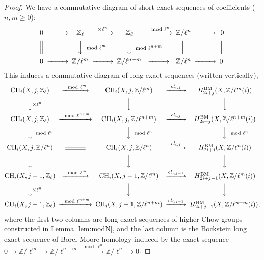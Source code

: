 \documentclass{amsart}
\theoremstyle{definition}
\theoremstyle{remark}
\newcommand{\mbb}{\mathbb}
\newcommand{\ZZ}{\mbb{Z}}
\begin{document}
\begin{proof}
    We have a commutative diagram of short exact sequences of coefficients ($n, m \geq 0$):
    \[
    \begin{CD}
        0 @>>> \ZZ_\ell @>\times \ell^n>> \ZZ_\ell @>\mod \ell^n>> \ZZ/\ell^n @>>> 0\\
        @| @VV\mod \ell^m V @VV\mod \ell^{n+m}V @| @|\\
        0 @>>> \ZZ/\ell^m @>>> \ZZ/\ell^{n+m} @>>> \ZZ/\ell^n @>>> 0.\\
    \end{CD}
    \]
    This induces a commutative diagram of long exact sequences (written vertically), 
    \[
    \begin{CD}
         \text{CH}_i(X, j, \ZZ_\ell) @>{\mod \ell^m}>> \text{CH}_i(X, j, \ZZ/\ell^m) @>cl_{i, j}>> H_{2i+j}^{\text{BM}}(X, \ZZ/{\ell^m}(i)) \\
        @VV\times \ell^n V @VVV @VVV \\
         \text{CH}_i(X, j, \ZZ_\ell) @>{\mod \ell^{n+m}}>> \text{CH}_i(X, j, \ZZ/{\ell^{n+m}}) @>cl_{i, j}>> H_{2i+j}^{\text{BM}}(X, \ZZ/{\ell^{n+m}}(i))\\
        @VV\mod \ell^n V @VV\mod \ell^n V @VV\mod \ell^n V \\
          \text{CH}_i(X, j, \ZZ/\ell^n) @=\text{CH}_i(X, j, \ZZ/\ell^n) @>cl_{i, j}>> H_{2i+j}^{\text{BM}}(X, \ZZ/{\ell^n}(i))\\
          @VVV @VVV @VVV\\
          \text{CH}_i(X, j-1, \ZZ_\ell)@>{\mod \ell^m}>> \text{CH}_i(X, j-1, \ZZ/\ell^m) @>cl_{i, j-1}>> H_{2i+j-1}^{\text{BM}}(X, \ZZ/{\ell^m}(i))\\
          @VV\times \ell^n V @VVV @VVV \\
         \text{CH}_i(X, j-1, \ZZ_\ell) @>{\mod \ell^{n+m}}>> \text{CH}_i(X, j-1, \ZZ/{\ell^{n+m}}) @>cl_{i, j-1}>> H_{2i+j-1}^{\text{BM}}(X, \ZZ/{\ell^{n+m}}(i)),
    \end{CD}
    \]
    where the first two columns are long exact sequences of higher Chow groups constructed in Lemma \ref{lem:modN}, and the last column is the Bockstein long exact sequence of Borel-Moore homology induced by the exact sequence $0 \to \ZZ/\ell^m \to \ZZ/\ell^{n+m} \xrightarrow{\mod \ell^n} \ZZ/\ell^n \to 0$.
    

\end{proof}
\end{document}
